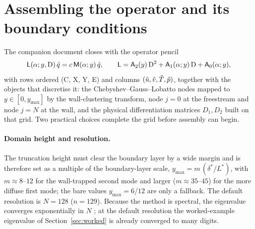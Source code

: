 \documentclass[11pt]{article}
\begin{document}
\section{Assembling the operator and its boundary conditions}\label{sec:assemble}
The companion document closes with the operator pencil
\begin{equation}\label{eq:pencilA}
  \mathsf L(\alpha;y,\mathrm{D})\,\hat{q}=c\,\mathsf M(\alpha;y)\,\hat{q},\qquad
  \mathsf L=\mathsf A_2(y)\,\mathrm{D}^2+\mathsf A_1(\alpha;y)\,\mathrm{D}+\mathsf A_0(\alpha;y),
\end{equation}
with rows ordered (C, X, Y, E) and columns $(\hat{u},\hat{v},\hat{T},\hat{p})$, together with the objects
that discretise it: the Chebyshev--Gauss--Lobatto nodes mapped to $y\in[0,y_{\max}]$ by the
wall-clustering transform, node $j{=}0$ at the freestream and node $j{=}N$ at the wall, and the
physical differentiation matrices $D_1,D_2$ built on that grid. Two practical choices complete the
grid before assembly can begin.

\paragraph{Domain height and resolution.} The truncation height must clear the boundary layer by a
wide margin and is therefore set as a multiple of the boundary-layer scale,
$y_{\max}=m\,(\delta^*/L^*)$, with $m\approx8$--$12$ for the wall-trapped second mode and larger
($m\approx35$--$45$) for the more diffuse first mode; the bare values $y_{\max}=6$/$12$ are only a
fallback. The default resolution is $N=128$ ($n=129$). Because the method is spectral, the eigenvalue
converges exponentially in $N$ \cite{orszag1971,trefethen2000}; at the default resolution the
worked-example eigenvalue of Section~\ref{sec:worked} is already converged to many digits.
\end{document}
